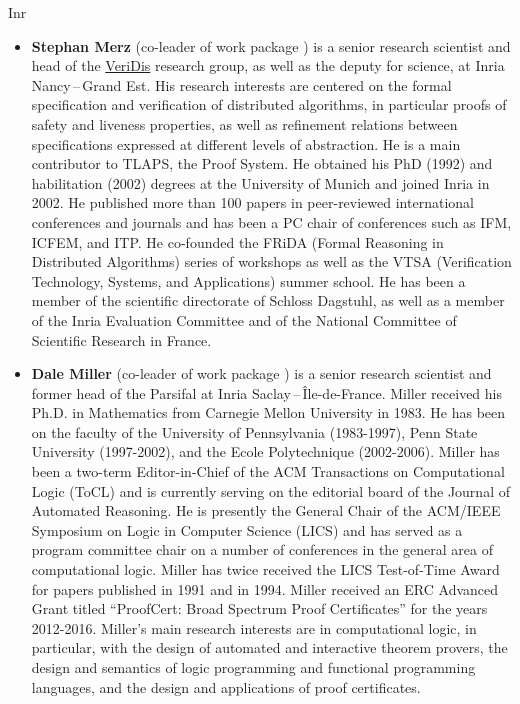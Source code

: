\begin{sitedescription}{Inr}
\begin{itemize}
\item{\bf Stephan Merz} (co-leader of work package ) is a senior research
scientist and head of the \href{https://team.inria.fr/veridis/}{VeriDis}
research group, as well as the deputy for science, at Inria Nancy\,--\,Grand Est.
His research interests are centered on the formal specification and verification
of distributed algorithms, in particular proofs of safety and liveness
properties, as well as refinement relations between specifications expressed at
different levels of abstraction. He is a main contributor to TLAPS, the \tlaplus
Proof System. He obtained his PhD (1992) and habilitation (2002) degrees at the
University of Munich and joined Inria in 2002. He published more than 100 papers
in peer-reviewed international conferences and journals and has been a PC chair
of conferences such as IFM, ICFEM, and ITP. He co-founded the FRiDA (Formal
Reasoning in Distributed Algorithms) series of workshops as well as the VTSA
(Verification Technology, Systems, and Applications) summer school. He has been
a member of the scientific directorate of Schloss Dagstuhl, as well as a member
of the Inria Evaluation Committee and of the National Committee of Scientific
Research in France.

\item {\bf Dale Miller} (co-leader of work package ) is a senior research scientist
and former head of the Parsifal at Inria Saclay\,--\,\^Ile-de-France.  Miller
received his Ph.D. in Mathematics from Carnegie Mellon University in 1983.  He
has been on the faculty of the University of Pennsylvania (1983-1997), Penn
State University (1997-2002), and the Ecole Polytechnique (2002-2006). Miller
has been a two-term Editor-in-Chief of the ACM Transactions on Computational
Logic (ToCL) and is currently serving on the editorial board of the Journal of
Automated Reasoning. He is presently the General Chair of the ACM/IEEE Symposium
on Logic in Computer Science (LICS) and has served as a program committee chair
on a number of conferences in the general area of computational logic.  Miller
has twice received the LICS Test-of-Time Award for papers published in 1991 and
in 1994.  Miller received an ERC Advanced Grant titled “ProofCert: Broad
Spectrum Proof Certificates” for the years 2012-2016.  Miller's main research
interests are in computational logic, in particular, with the design of
automated and interactive theorem provers, the design and semantics of logic
programming and functional programming languages, and the design and
applications of proof certificates.


\end{itemize}
\end{sitedescription}
